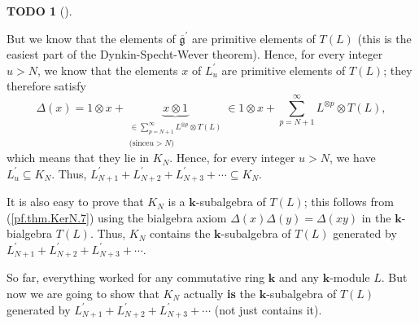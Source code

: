 \documentclass[numbers=enddot,12pt,final,onecolumn,notitlepage]{scrartcl}%
\theoremstyle{definition}
\newtheorem{quest}[theo]{TODO}
\newenvironment{todo}[1][]
{\begin{quest}[#1]\begin{leftbar}}
{\end{leftbar}\end{quest}}
\let\sumnonlimits\sum
\renewcommand{\sum}{\sumnonlimits\limits}
\begin{document}
\begin{todo}
But we know that the elements of $\overline{\mathfrak{g}}^{\prime}$ are
primitive elements of $T\left(  L\right)  $ (this is the easiest part of the
Dynkin-Specht-Wever theorem). Hence, for every integer $u>N$, we know that the
elements $x$ of $L_{u}^{\prime}$ are primitive elements of $T\left(  L\right)
$; they therefore satisfy%
\begin{equation}
\Delta\left(  x\right)  =1\otimes x+\underbrace{x\otimes1}_{\substack{\in
\sum_{p=N+1}^{\infty}L^{\otimes p}\otimes T\left(  L\right)  \\\text{(since
}u>N\text{)}}}\in1\otimes x+\sum_{p=N+1}^{\infty}L^{\otimes p}\otimes T\left(
L\right)  , \label{todo.72}%
\end{equation}
which means that they lie in $K_{N}$. Hence, for every integer $u>N$, we have
$L_{u}^{\prime}\subseteq K_{N}$. Thus, $L_{N+1}^{\prime}+L_{N+2}^{\prime
}+L_{N+3}^{\prime}+\cdots\subseteq K_{N}$.

It is also easy to prove that $K_{N}$ is a $\mathbf{k}$-subalgebra of
$T\left(  L\right)  $; this follows from (\ref{pf.thm.KerN.7}) using the
bialgebra axiom $\Delta\left(  x\right)  \Delta\left(  y\right)
=\Delta\left(  xy\right)  $ in the $\mathbf{k}$-bialgebra $T\left(  L\right)
$. Thus, $K_{N}$ contains the $\mathbf{k}$-subalgebra of $T\left(  L\right)  $
generated by $L_{N+1}^{\prime}+L_{N+2}^{\prime}+L_{N+3}^{\prime}+\cdots$.

So far, everything worked for any commutative ring $\mathbf{k}$ and any
$\mathbf{k}$-module $L$. But now we are going to show that $K_{N}$ actually
\textbf{is} the $\mathbf{k}$-subalgebra of $T\left(  L\right)  $ generated by
$L_{N+1}^{\prime}+L_{N+2}^{\prime}+L_{N+3}^{\prime}+\cdots$ (not just contains it).


\end{todo}
\end{document}
